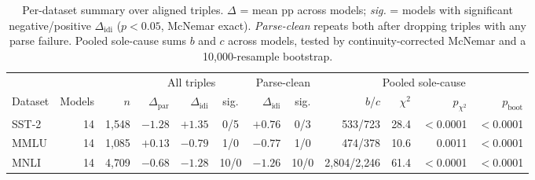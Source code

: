 \documentclass{article}   %
\begin{document}
\begin{table}[t]
\centering
\caption{Per-dataset summary over aligned triples. $\Delta$ = mean pp across
models; \emph{sig.} = models with significant negative/positive
$\Delta_{\text{idi}}$ ($p < 0.05$, McNemar exact). \emph{Parse-clean} repeats
both after dropping triples with any parse failure. Pooled sole-cause sums $b$
and $c$ across models, tested by continuity-corrected McNemar and a
10{,}000-resample bootstrap.}
\label{tab:summary}
\scriptsize
\setlength{\tabcolsep}{4pt}
\begin{tabular}{lrrrrcrcrrrr}
\toprule
& & & \multicolumn{3}{c}{All triples} & \multicolumn{2}{c}{Parse-clean}
  & \multicolumn{4}{c}{Pooled sole-cause} \\
\cmidrule(lr){4-6} \cmidrule(lr){7-8} \cmidrule(lr){9-12}
Dataset & Models & $n$ & $\Delta_{\text{par}}$ & $\Delta_{\text{idi}}$ & sig.
  & $\Delta_{\text{idi}}$ & sig. & $b$/$c$ & $\chi^2$ & $p_{\chi^2}$ & $p_{\text{boot}}$ \\
\midrule
SST-2 & 14 & 1{,}548 & $-1.28$ & $+1.35$ & 0/5 & $+0.76$ & 0/3 & 533/723 & 28.4 & $<$0.0001 & $<$0.0001 \\
MMLU & 14 & 1{,}085 & $+0.13$ & $-0.79$ & 1/0 & $-0.77$ & 1/0 & 474/378 & 10.6 & 0.0011 & $<$0.0001 \\
MNLI & 14 & 4{,}709 & $-0.68$ & $-1.28$ & 10/0 & $-1.26$ & 10/0 & 2{,}804/2{,}246 & 61.4 & $<$0.0001 & $<$0.0001 \\
\bottomrule
\end{tabular}
\end{table}
\end{document}
